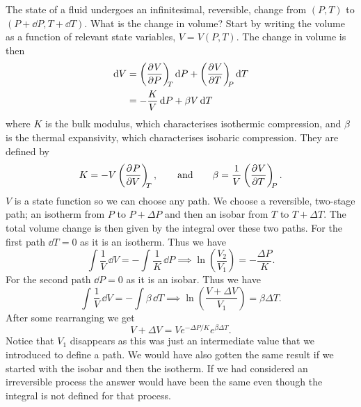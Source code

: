     \begin{example}
        The state of a fluid undergoes an infinitesimal, reversible, change from \((P, T)\) to \((P + \dd{P}, T + \dd{T})\).
        What is the change in volume?
        Start by writing the volume as a function of relevant state variables, \(V = V(P, T)\).
        The change in volume is then
        \begin{align*}
            \dd{V} &= \left(\pdv[]{V}{P}\right)_{\!\!{T}}\dd{P} + \left(\pdv[]{V}{T}\right)_{\!\!{P}}\dd{T}\\
            &= -\frac{K}{V}\dd{P} + \beta V\dd{T}
        \end{align*}
        where \(K\) is the bulk modulus, which characterises isothermic compression, and \(\beta\) is the thermal expansivity, which characterises isobaric compression.
        They are defined by
        \[K = -V\left(\pdv[]{P}{V}\right)_{\!\!{T}},\qquad\text{and}\qquad\beta = \frac{1}{V}\left(\pdv[]{V}{T}\right)_{\!\!{P}}.\]
        \(V\) is a state function so we can choose any path.
        We choose a reversible, two-stage path; an isotherm from \(P\) to \(P + \Delta P\) and then an isobar from \(T\) to \(T + \Delta T\).
        The total volume change is then given by the integral over these two paths.
        For the first path \(\dd{T} = 0\) as it is an isotherm.
        Thus we have
        \[\int\frac{1}{V}\,\dd{V} = -\int\frac{1}{K}\,\dd{P} \implies \ln\left(\frac{V_2}{V_1}\right) = -\frac{\Delta P}{K}.\]
        For the second path \(\dd{P} = 0\) as it is an isobar.
        Thus we have
        \[\int\frac{1}{V}\,\dd{V} = -\int\beta\,\dd{T} \implies \ln\left(\frac{V + \Delta V}{V_1}\right) = \beta\Delta T.\]
        After some rearranging we get
        \[V + \Delta V = Ve^{-\Delta P/K}e^{\beta\Delta T}.\]
        Notice that \(V_1\) disappears as this was just an intermediate value that we introduced to define a path.
        We would have also gotten the same result if we started with the isobar and then the isotherm.
        If we had considered an irreversible process the answer would have been the same even though the integral is not defined for that process.
    \end{example}
    
